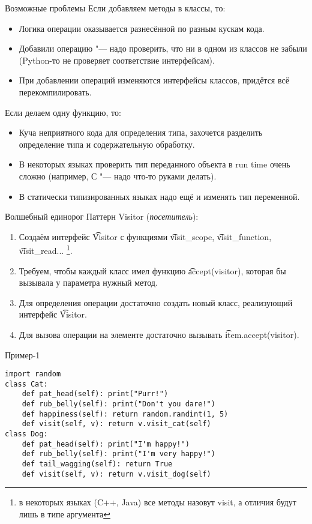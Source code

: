 \begin{frame}{Возможные проблемы}
	Если добавляем методы в классы, то:
	\pause
	\begin{itemize}
		\item Логика операции оказывается разнесённой по разным кускам кода.
		\item Добавили операцию "--- надо проверить, что ни в одном из классов не забыли
			(Python-то не проверяет соответствие интерфейсам).
		\item
			При добавлении операций изменяются интерфейсы классов, придётся всё перекомпилировать.
	\end{itemize}

	\pause
	Если делаем одну функцию, то:
	\pause
	\begin{itemize}
		\item Куча неприятного кода для определения типа, захочется разделить определение типа и содержательную обработку.
		\item В некоторых языках проверить тип переданного объекта в run time очень сложно (например, С "--- надо что-то руками делать).
		\item В статически типизированных языках надо ещё и изменять тип переменной.
	\end{itemize}
\end{frame}

\begin{frame}{Волшебный единорог}
	Паттерн Visitor (\textit{посетитель}):
	\begin{enumerate}
		\item
			Создаём интерфейс \t{Visitor} с функциями \t{visit\_scope}, \t{visit\_function}, \t{visit\_read}...
			\footnote{в некоторых языках (C++, Java) все методы назовут visit, а отличия будут лишь в типе аргумента}.
		\item
			Требуем, чтобы каждый класс имел функцию \t{accept(visitor)}, которая бы вызывала у параметра нужный метод.
		\item
			Для определения операции достаточно создать новый класс, реализующий интерфейс \t{Visitor}.
		\item
			Для вызова операции на элементе достаточно вызывать \t{item.accept(visitor)}.
	\end{enumerate}
\end{frame}

\begin{frame}[fragile]{Пример-1}
\begin{verbatim}
import random
class Cat:
    def pat_head(self): print("Purr!")
    def rub_belly(self): print("Don't you dare!")
    def happiness(self): return random.randint(1, 5)
    def visit(self, v): return v.visit_cat(self)
class Dog:
    def pat_head(self): print("I'm happy!")
    def rub_belly(self): print("I'm very happy!")
    def tail_wagging(self): return True
    def visit(self, v): return v.visit_dog(self)
\end{verbatim}
\end{frame}

